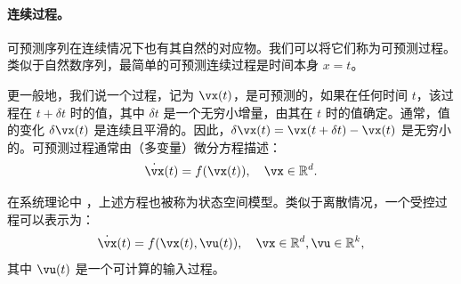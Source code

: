 \documentclass[../../book-main.tex]{subfiles}
\begin{document}

\paragraph{连续过程。}
可预测序列在连续情况下也有其自然的对应物。我们可以将它们称为可预测过程。类似于自然数序列，最简单的可预测连续过程是时间本身 $x=t$。

更一般地，我们说一个过程，记为 $\vx(t)$，是可预测的，如果在任何时间 $t$，该过程在 $t+\delta t$ 时的值，其中 $\delta t$ 是一个无穷小增量，由其在 $t$ 时的值确定。通常，值的变化 $\delta \vx(t)$ 是连续且平滑的。因此，$\delta \vx(t) = \vx(t + \delta t) - \vx(t)$ 是无穷小的。可预测过程通常由（多变量）微分方程描述：
\begin{equation}
    \dot{\vx}(t) = f(\vx(t)), \quad \vx \in \mathbb{R}^d. 
    \label{eqn:process}
\end{equation}

在系统理论中 \cite{Cal:Des,Sastry-Nonlinear}，上述方程也被称为状态空间模型。类似于离散情况，一个受控过程可以表示为：
\begin{equation}
    \dot{\vx}(t) = f(\vx(t), \vu(t) ), \quad \vx \in \mathbb{R}^d, \vu \in \mathbb{R}^k,
    \label{eqn:process-controlled}
\end{equation}
其中 $\vu(t)$ 是一个可计算的输入过程。
\end{document}
